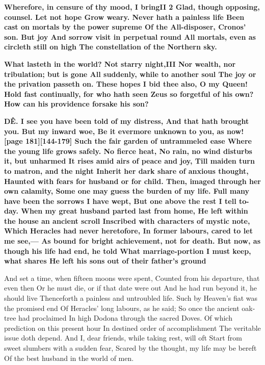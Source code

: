 \documentclass[11pt,letter]{book}
\begin{document}
\par \textbf{Wherefore, in censure of thy mood, I bringII 2 Glad, though opposing, counsel. Let not hope Grow weary. Never hath a painless life Been cast on mortals by the power supreme Of the All-disposer, Cronos’ son. But joy And sorrow visit in perpetual round All mortals, even as circleth still on high The constellation of the Northern sky.}
\par 

\par \textbf{What lasteth in the world? Not starry night,III Nor wealth, nor tribulation; but is gone All suddenly, while to another soul The joy or the privation passeth on. These hopes I bid thee also, O my Queen! Hold fast continually, for who hath seen Zeus so forgetful of his own? How can his providence forsake his son?}
\par 

\par \textbf{DÊ. I see you have been told of my distress, And that hath brought you. But my inward woe, Be it evermore unknown to you, as now! [page 181][144-179] Such the fair garden of untrammeled ease Where the young life grows safely. No fierce heat, No rain, no wind disturbs it, but unharmed It rises amid airs of peace and joy, Till maiden turn to matron, and the night Inherit her dark share of anxious thought, Haunted with fears for husband or for child. Then, imaged through her own calamity, Some one may guess the burden of my life. Full many have been the sorrows I have wept, But one above the rest I tell to-day. When my great husband parted last from home, He left within the house an ancient scroll Inscribed with characters of mystic note, Which Heracles had never heretofore, In former labours, cared to let me see,— As bound for bright achievement, not for death. But now, as though his life had end, he told What marriage-portion I must keep, what shares He left his sons out of their father’s ground}
\par   And set a time, when fifteen moons were spent, Counted from his departure, that even then Or he must die, or if that date were out And he had run beyond it, he should live Thenceforth a painless and untroubled life. Such by Heaven’s fiat was the promised end Of Heracles’ long labours, as he said; So once the ancient oak-tree had proclaimed In high Dodona through the sacred Doves. Of which prediction on this present hour In destined order of accomplishment The veritable issue doth depend. And I, dear friends, while taking rest, will oft Start from sweet slumbers with a sudden fear, Scared by the thought, my life may be bereft Of the best husband in the world of men.
\end{document}
